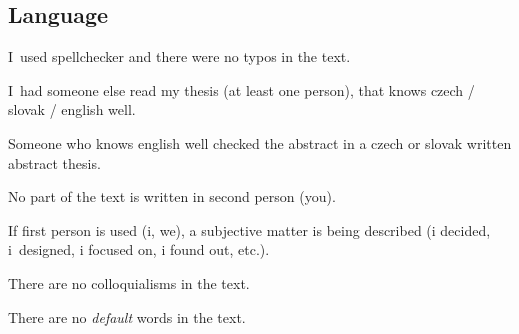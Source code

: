 \subsection*{Language}
\begin{checklist}
	\item I~used spellchecker and there were no typos in the text.
    \item I~had someone else read my thesis (at least one person), that knows czech / slovak / english well.
    \item Someone who knows english well checked the abstract  in a czech or slovak written abstract thesis.
    \item No part of the text is written in second person (you).
    \item If first person is used (i, we), a subjective matter is being described (i decided, i~designed, i focused on, i found out, etc.).
    \item There are no colloquialisms in the text.
    \item There are no {\it default} words in the text.
\end{checklist}

